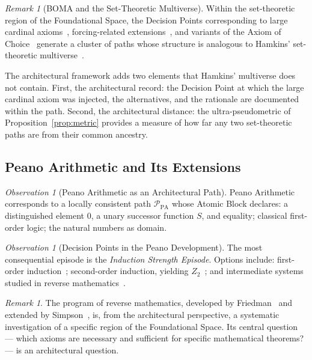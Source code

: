 \documentclass[12pt, a4paper]{article}
\theoremstyle{plain}
\theoremstyle{definition}
\theoremstyle{remark}
\newtheorem{remark}[theorem]{Remark}
\newtheorem{observation}[theorem]{Observation}
\newcommand{\BOMA}{\textsf{BOMA}}
\begin{document}
\begin{remark}[\BOMA{} and the Set-Theoretic Multiverse]
\label{rem:multiverse-zfc}
Within the set-theoretic region of the Foundational Space, the Decision
Points corresponding to large cardinal axioms~\cite{Jech2003,Kunen1980},
forcing-related extensions~\cite{Cohen1963,Cohen1964}, and variants of
the Axiom of Choice~\cite{Moore1982} generate a cluster of paths whose
structure is analogous to Hamkins' set-theoretic multiverse~\cite{Hamkins2012}.

The architectural framework adds two elements that Hamkins' multiverse
does not contain. First, the architectural record: the Decision Point
at which the large cardinal axiom was injected, the alternatives, and
the rationale are documented within the path. Second, the architectural
distance: the ultra-pseudometric of Proposition~\ref{prop:metric}
provides a measure of how far any two set-theoretic paths are from their
common ancestry.
\end{remark}

\subsection{Peano Arithmetic and Its Extensions}
\label{subsec:pa}

\begin{observation}[Peano Arithmetic as an Architectural Path]
\label{obs:pa-path}
Peano Arithmetic~\cite{Peano1889} corresponds to a locally consistent
path $\mathcal{P}_{\mathrm{PA}}$ whose Atomic Block declares: a
distinguished element $0$, a unary successor function $S$, and
equality; classical first-order logic; the natural numbers as domain.
\end{observation}

\begin{observation}[Decision Points in the Peano Development]
\label{obs:pa-episodes}
The most consequential episode is the \emph{Induction Strength Episode}.
Options include: first-order induction~\cite{Peano1889}; second-order
induction, yielding $Z_2$~\cite{Simpson2009}; and intermediate systems
studied in reverse mathematics~\cite{Friedman1975,Simpson2009}.
\end{observation}

\begin{remark}
The program of reverse mathematics, developed by Friedman~\cite{Friedman1975}
and extended by Simpson~\cite{Simpson2009}, is, from the architectural
perspective, a systematic investigation of a specific region of the
Foundational Space. Its central question --- which axioms are necessary
and sufficient for specific mathematical theorems? --- is an
architectural question.
\end{remark}
\end{document}

